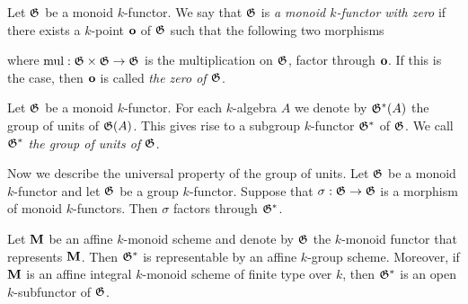 \begin{definition}
Let ${\mathfrak G}$ be a monoid $k$-functor. We say that ${\mathfrak G}$ is \textit{a monoid $k$-functor with zero} if there exists a $k$-point $\mathbf{o}$ of ${\mathfrak G}$ such that the following two morphisms
\begin{center}   
\end{center}
where $\textrm{mul}: {\mathfrak G} \times {\mathfrak G} \rightarrow {\mathfrak G}$ is the multiplication on ${\mathfrak G}$, factor through $\mathbf{o}$. If this is the case, then $\mathbf{o}$ is called \textit{the zero of ${\mathfrak G}$}.
\end{definition}

\begin{definition}
Let ${\mathfrak G}$ be a monoid $k$-functor. For each $k$-algebra $A$ we denote by ${\mathfrak G}^*(A)$ the group of units of ${\mathfrak G}(A)$. This gives rise to a subgroup $k$-functor ${\mathfrak G}^*$ of ${\mathfrak G}$. We call ${\mathfrak G}^*$ \textit{the group of units of ${\mathfrak G}$}.
\end{definition}
\noindent
Now we describe the universal property of the group of units. Let ${\mathfrak G}$ be a monoid $k$-functor and let ${\mathfrak G}$ be a group $k$-functor. Suppose that $\sigma:{\mathfrak G}\rightarrow {\mathfrak G}$ is a morphism of monoid $k$-functors. Then $\sigma$ factors through ${\mathfrak G}^*$.

\begin{proposition}\label{proposition:integral_monoids_groups_of_units_are_schematically_dense}
Let $\mathbf{M}$ be an affine $k$-monoid scheme and denote by ${\mathfrak G}$ the $k$-monoid functor that represents $\mathbf{M}$. Then ${\mathfrak G}^*$ is representable by an affine $k$-group scheme. Moreover, if $\mathbf{M}$ is an affine integral $k$-monoid scheme of finite type over $k$, then ${\mathfrak G}^*$ is an open $k$-subfunctor of ${\mathfrak G}$.
\end{proposition}



